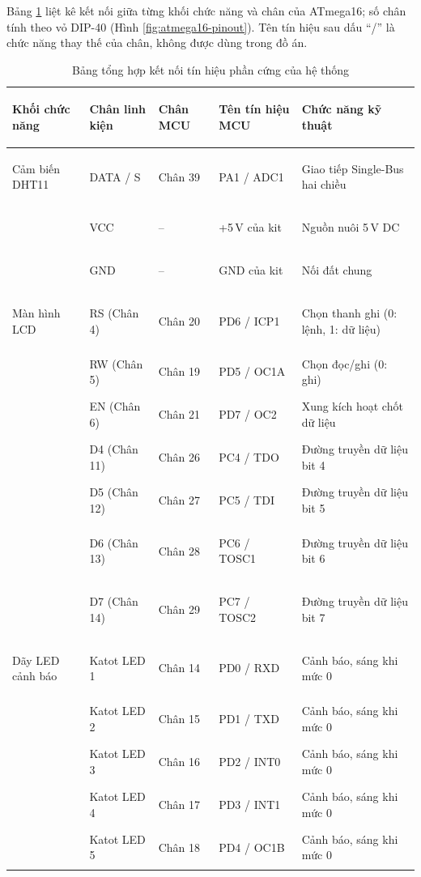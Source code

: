 Bảng \ref{tab:hardware-wiring} liệt kê kết nối giữa từng khối chức năng và chân của ATmega16; số chân tính theo vỏ DIP-40 (Hình \ref{fig:atmega16-pinout}). Tên tín hiệu sau dấu ``/'' là chức năng thay thế của chân, không được dùng trong đồ án.

\begin{table}[H]
\centering
\small
\caption{Bảng tổng hợp kết nối tín hiệu phần cứng của hệ thống}
\label{tab:hardware-wiring}
\renewcommand{\arraystretch}{1.08}
\setlength{\tabcolsep}{3pt}
\begin{tabularx}{\textwidth}{>{\bfseries\raggedright\arraybackslash}p{2.1cm} >{\raggedright\arraybackslash}p{2.5cm} >{\centering\arraybackslash}p{1.7cm} >{\bfseries\raggedright\arraybackslash}p{2.6cm} >{\raggedright\arraybackslash}X}
\toprule
Khối chức năng & Chân linh kiện & Chân MCU & Tên tín hiệu MCU & Chức năng kỹ thuật \\
\midrule
Cảm biến DHT11 & DATA / S & Chân 39 & PA1 / ADC1 & Giao tiếp Single-Bus hai chiều \\
               & VCC & -- & +5\,V của kit & Nguồn nuôi 5\,V DC \\
               & GND & -- & GND của kit & Nối đất chung \\
\midrule
Màn hình LCD   & RS (Chân 4)  & Chân 20 & PD6 / ICP1 & Chọn thanh ghi (0: lệnh, 1: dữ liệu) \\
               & RW (Chân 5)  & Chân 19 & PD5 / OC1A & Chọn đọc/ghi (0: ghi) \\
               & EN (Chân 6)  & Chân 21 & PD7 / OC2 & Xung kích hoạt chốt dữ liệu \\
               & D4 (Chân 11) & Chân 26 & PC4 / TDO & Đường truyền dữ liệu bit 4 \\
               & D5 (Chân 12) & Chân 27 & PC5 / TDI & Đường truyền dữ liệu bit 5 \\
               & D6 (Chân 13) & Chân 28 & PC6 / TOSC1 & Đường truyền dữ liệu bit 6 \\
               & D7 (Chân 14) & Chân 29 & PC7 / TOSC2 & Đường truyền dữ liệu bit 7 \\
\midrule
Dãy LED cảnh báo & Katot LED 1 & Chân 14 & PD0 / RXD & Cảnh báo, sáng khi mức 0 \\
               & Katot LED 2 & Chân 15 & PD1 / TXD & Cảnh báo, sáng khi mức 0 \\
               & Katot LED 3 & Chân 16 & PD2 / INT0 & Cảnh báo, sáng khi mức 0 \\
               & Katot LED 4 & Chân 17 & PD3 / INT1 & Cảnh báo, sáng khi mức 0 \\
               & Katot LED 5 & Chân 18 & PD4 / OC1B & Cảnh báo, sáng khi mức 0 \\
\bottomrule
\end{tabularx}
\end{table}

